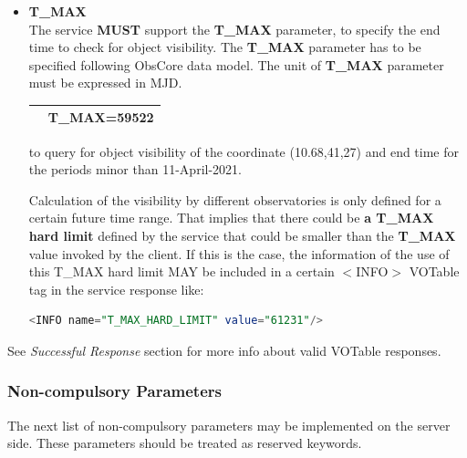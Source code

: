 \documentclass[11pt,a4paper]{ivoa}
\begin{document}
\begin{itemize}
\item{\textbf{T\_MAX}\\The service \textbf{MUST }support the \textbf{T\_MAX }
parameter, to specify the end time to check for object visibility. The
\textbf{T\_MAX} parameter has to be specified following ObsCore data model.
The unit of \textbf{T\_MAX} parameter must be expressed in MJD.\\
\begin{table}[h]
\centering
\begin{tabular}{|l|l|}
\hline
\begin{lstlisting}[language=SQL]
http://xmmvischeck.esac.esa.int:8080/objvissap/query?
POS=10.68,41.27&T_MAX=59522
\end{lstlisting}
\\
\hline
\end{tabular}
\end{table}
to query for object visibility of the coordinate (10.68,41,27) and end
time for the periods minor than 11-April-2021.\par
Calculation of the visibility by different observatories is only defined
for a certain future time range. That implies that there could be
\textbf{a T\_MAX hard limit} defined by the service that could be
smaller than the \textbf{T\_MAX} value invoked by the client. If this
is the case, the information of the use of this T\_MAX hard limit MAY be
included in a certain $<$INFO$>$ VOTable tag in the service response
like:
\begin{lstlisting}[language=SQL]
<INFO name="T_MAX_HARD_LIMIT" value="61231"/>
\end{lstlisting}
}
\end{itemize}

See \textit{Successful Response} section for more info about valid
VOTable res\-pon\-ses.

\subsubsection{Non-compulsory Parameters}
The next list of non-compulsory parameters may be implemented on the
server side. These parameters should be treated as reserved keywords.
\end{document}
